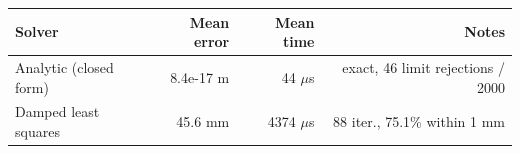 \begin{tabular}{lrrr}
\toprule
Solver & Mean error & Mean time & Notes \\
\midrule
Analytic (closed form) & 8.4e-17 m & 44 $\mu$s & exact, 46 limit rejections / 2000 \\
Damped least squares & 45.6 mm & 4374 $\mu$s & 88 iter., 75.1\% within 1 mm \\
\bottomrule
\end{tabular}
